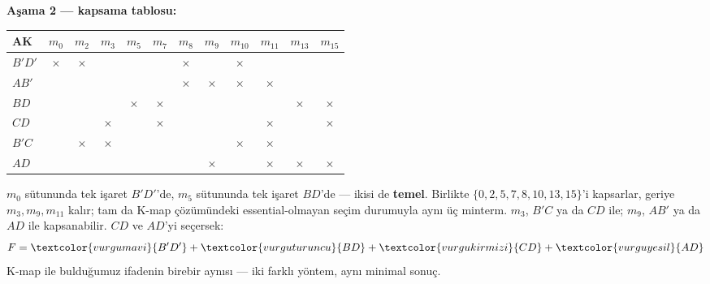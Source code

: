 \begin{ornek}
\textbf{Aşama 2 --- kapsama tablosu:}
\begin{center}
\scriptsize
\begin{tabular}{l*{11}{c}}
\toprule
AK & $m_0$ & $m_2$ & $m_3$ & $m_5$ & $m_7$ & $m_8$ & $m_9$ & $m_{10}$ & $m_{11}$ & $m_{13}$ & $m_{15}$ \\
\midrule
$B'D'$ & $\times$ & $\times$ & & & & $\times$ & & $\times$ & & & \\
$AB'$ & & & & & & $\times$ & $\times$ & $\times$ & $\times$ & & \\
$BD$ & & & & $\times$ & $\times$ & & & & & $\times$ & $\times$ \\
$CD$ & & & $\times$ & & $\times$ & & & & $\times$ & & $\times$ \\
$B'C$ & & $\times$ & $\times$ & & & & & $\times$ & $\times$ & & \\
$AD$ & & & & & & & $\times$ & & $\times$ & $\times$ & $\times$ \\
\bottomrule
\end{tabular}
\end{center}
$m_0$ sütununda tek işaret $B'D'$'de, $m_5$ sütununda tek işaret $BD$'de --- ikisi de
\textbf{temel}. Birlikte $\{0,2,5,7,8,10,13,15\}$'i kapsarlar, geriye $m_3,m_9,m_{11}$
kalır; tam da K-map çözümündeki essential-olmayan seçim durumuyla aynı üç minterm.
$m_3$, $B'C$ ya da $CD$ ile; $m_9$, $AB'$ ya da $AD$ ile kapsanabilir. $CD$ ve $AD$'yi
seçersek:
\[
F = \textcolor{vurgumavi}{B'D'} + \textcolor{vurguturuncu}{BD} + \textcolor{vurgukirmizi}{CD} + \textcolor{vurguyesil}{AD}
\]
K-map ile bulduğumuz ifadenin birebir aynısı --- iki farklı yöntem, aynı minimal
sonuç.


\end{ornek}
